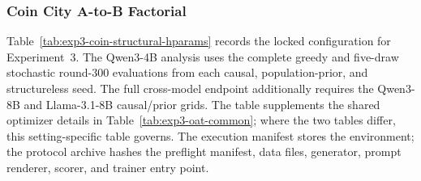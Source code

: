 \subsubsection{Coin City A-to-B Factorial}
\label{app:exp3-coin-structural-hparams}

Table~\ref{tab:exp3-coin-structural-hparams} records the locked configuration
for Experiment~3. The Qwen3-4B analysis uses the complete greedy and five-draw
stochastic round-300 evaluations from each causal, population-prior, and
structureless seed. The full cross-model endpoint additionally requires the
Qwen3-8B and Llama-3.1-8B causal/prior grids. The table supplements the shared optimizer
details in Table~\ref{tab:exp3-oat-common}; where the two tables differ, this
setting-specific table governs. The execution manifest stores the environment;
the protocol archive hashes the preflight manifest, data files,
generator, prompt renderer, scorer, and trainer entry point.

